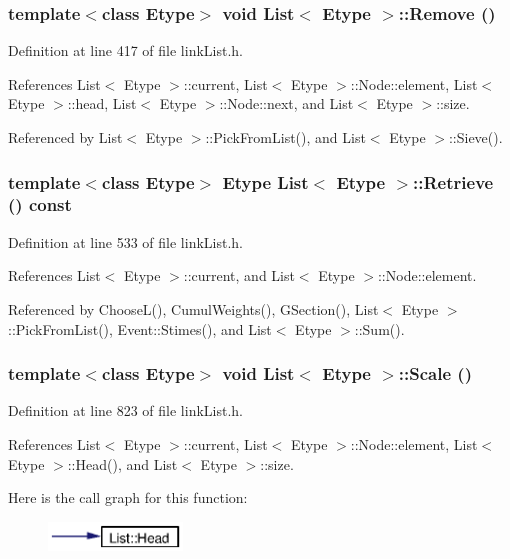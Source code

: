 \subsubsection{\setlength{\rightskip}{0pt plus 5cm}template$<$class Etype$>$ void {\bf List}$<$ Etype $>$::Remove ()}\label{classList_a9}




Definition at line 417 of file link\-List.h.

References List$<$ Etype $>$::current, List$<$ Etype $>$::Node::element, List$<$ Etype $>$::head, List$<$ Etype $>$::Node::next, and List$<$ Etype $>$::size.

Referenced by List$<$ Etype $>$::Pick\-From\-List(), and List$<$ Etype $>$::Sieve().
\subsubsection{\setlength{\rightskip}{0pt plus 5cm}template$<$class Etype$>$ Etype {\bf List}$<$ Etype $>$::Retrieve () const}\label{classList_a15}




Definition at line 533 of file link\-List.h.

References List$<$ Etype $>$::current, and List$<$ Etype $>$::Node::element.

Referenced by Choose\-L(), Cumul\-Weights(), GSection(), List$<$ Etype $>$::Pick\-From\-List(), Event::Stimes(), and List$<$ Etype $>$::Sum().
\subsubsection{\setlength{\rightskip}{0pt plus 5cm}template$<$class Etype$>$ void {\bf List}$<$ Etype $>$::Scale ()}\label{classList_a26}




Definition at line 823 of file link\-List.h.

References List$<$ Etype $>$::current, List$<$ Etype $>$::Node::element, List$<$ Etype $>$::Head(), and List$<$ Etype $>$::size.

Here is the call graph for this function:\begin{figure}[H]
\begin{center}
\leavevmode
\includegraphics[width=101pt]{classList_a26_cgraph}
\end{center}
\end{figure}
